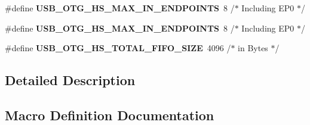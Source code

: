 \begin{DoxyCompactItemize}
\item 
\#define {\bfseries U\+S\+B\+\_\+\+O\+T\+G\+\_\+\+H\+S\+\_\+\+M\+A\+X\+\_\+\+I\+N\+\_\+\+E\+N\+D\+P\+O\+I\+N\+TS}~8    /$\ast$ Including E\+P0 $\ast$/\hypertarget{group___exported__macros_gae79bbfa7391870814f10c8025ade8a2a}{}\label{group___exported__macros_gae79bbfa7391870814f10c8025ade8a2a}

\item 
\#define {\bfseries U\+S\+B\+\_\+\+O\+T\+G\+\_\+\+H\+S\+\_\+\+M\+A\+X\+\_\+\+I\+N\+\_\+\+E\+N\+D\+P\+O\+I\+N\+TS}~8    /$\ast$ Including E\+P0 $\ast$/\hypertarget{group___exported__macros_gae79bbfa7391870814f10c8025ade8a2a}{}\label{group___exported__macros_gae79bbfa7391870814f10c8025ade8a2a}

\item 
\#define {\bfseries U\+S\+B\+\_\+\+O\+T\+G\+\_\+\+H\+S\+\_\+\+T\+O\+T\+A\+L\+\_\+\+F\+I\+F\+O\+\_\+\+S\+I\+ZE}~4096 /$\ast$ in Bytes $\ast$/\hypertarget{group___exported__macros_ga55a4488eac406bcff895de59782fd6a7}{}\label{group___exported__macros_ga55a4488eac406bcff895de59782fd6a7}

\end{DoxyCompactItemize}


\subsection{Detailed Description}


\subsection{Macro Definition Documentation}
